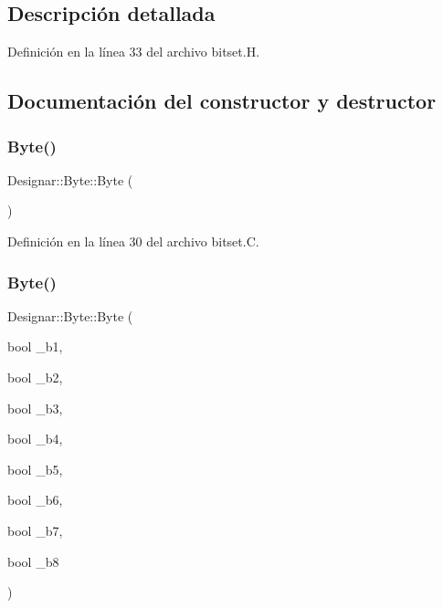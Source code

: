 \subsection{Descripción detallada}


Definición en la línea 33 del archivo bitset.\+H.



\subsection{Documentación del constructor y destructor}
\mbox{\label{class_designar_1_1_byte_a336815c676347de4aa09bc6342169f63}} 
\subsubsection{\texorpdfstring{Byte()}{Byte()}\hspace{0.1cm}{\footnotesize\ttfamily [1/3]}}
{\footnotesize\ttfamily Designar\+::\+Byte\+::\+Byte (\begin{DoxyParamCaption}{ }\end{DoxyParamCaption})}



Definición en la línea 30 del archivo bitset.\+C.

\mbox{\label{class_designar_1_1_byte_a21d54a921b6f2e30c189ae2998c40188}} 
\subsubsection{\texorpdfstring{Byte()}{Byte()}\hspace{0.1cm}{\footnotesize\ttfamily [2/3]}}
{\footnotesize\ttfamily Designar\+::\+Byte\+::\+Byte (\begin{DoxyParamCaption}\item[{bool}]{\+\_\+b1,  }\item[{bool}]{\+\_\+b2,  }\item[{bool}]{\+\_\+b3,  }\item[{bool}]{\+\_\+b4,  }\item[{bool}]{\+\_\+b5,  }\item[{bool}]{\+\_\+b6,  }\item[{bool}]{\+\_\+b7,  }\item[{bool}]{\+\_\+b8 }\end{DoxyParamCaption})}




